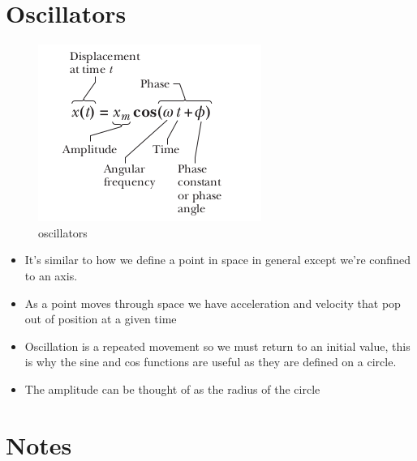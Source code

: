\documentclass[11pt]{article}
\begin{document}
\hypertarget{oscillators}{%
\section{Oscillators}\label{oscillators}}

\begin{figure}
\centering
\includegraphics{img/oscillators.png}
\caption{oscillators}
\end{figure}

\begin{itemize}
\tightlist
\item
  It's similar to how we define a point in space in general except we're
  confined to an axis.
\item
  As a point moves through space we have acceleration and velocity that
  pop out of position at a given time
\item
  Oscillation is a repeated movement so we must return to an initial
  value, this is why the sine and cos functions are useful as they are
  defined on a circle.
\item
  The amplitude can be thought of as the radius of the circle
\end{itemize}

\hypertarget{notes}{%
\section{Notes}\label{notes}}
\end{document}
